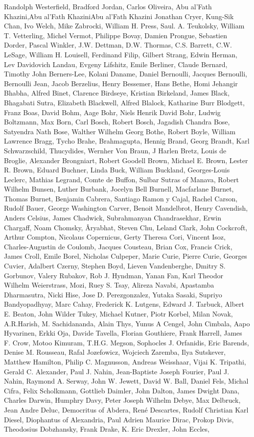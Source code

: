 \begin{spacing}{0.5}
\begin{tiny}
Randolph Westerfield, Bradford Jordan, Carlos Oliveira, Abu al'Fath Khazini,Abu al'Fath KhaziniAbu al'Fath Khazini Jonathan Cryer, Kung-Sik Chan, Ivo Welch, Mike Zabrocki, William H. Press, Saul. A. Teukolsky, William T. Vetterling, Michel Vermot, Philippe Bovay, Damien Prongue, Sebastien Dorder, Pascal Winkler, J.W. Dettman, D.W. Thormas, C.S. Barrett, C.W. LeSage, William H. Louisell, Ferdinand Filip, Gilbert Strang, Edwin Herman, Lev Davidovich Landau, Evgeny Lifshitz, Emile Berliner, Claude Bernard, Timothy John Berners-Lee, Kolani Daname, Daniel Bernoulli, Jacques Bernoulli, Bernoulli Jean, Jacob Berzelius, Henry Bessemer, Hans Bethe, Homi Jehangir Bhabha, Alfred Binet, Clarence Birdseye, Kristian Birkeland, James Black, Bhagabati Sutra, Elizabeth Blackwell, Alfred Blalock, Katharine Burr Blodgett, Franz Boas, David Bohm, Aage Bohr, Niels Henrik David Bohr, Ludwig Boltzmann, Max Born, Carl Bosch, Robert Bosch, Jagadish Chandra Bose, Satyendra Nath Bose, Walther Wilhelm Georg Bothe, Robert Boyle, William Lawrence Bragg, Tycho Brahe, Brahmagupta, Hennig Brand, Georg Brandt, Karl Schwarzschild, Thucydides, Wernher Von Braun, J Harlen Bretz, Louis de Broglie, Alexander Brongniart, Robert Goodell Brown, Michael E. Brown, Lester R. Brown, Eduard Buchner, Linda Buck, William Buckland, Georges-Louis Leclerc, Mathias Legrand, Comte de Buffon, Sulbar Sutras of Manava, Robert Wilhelm Bunsen, Luther Burbank, Jocelyn Bell Burnell, Macfarlane Burnet, Thomas Burnet, Benjamin Cabrera, Santiago Ramon y Cajal, Rachel Carson, Rudolf Bauer, George Washington Carver, Benoit Mandelbrot, Henry Cavendish, Anders Celsius, James Chadwick, Subrahmanyan Chandrasekhar, Erwin Chargaff, Noam Chomsky, Âryabhat, Steven Chu, Leland Clark, John Cockcroft, Arthur Compton, Nicolaus Copernicus, Gerty Theresa Cori, Vincent Isoz, Charles-Augustin de Coulomb, Jacques Cousteau, Brian Cox, Francis Crick, James Croll, Emile Borel, Nicholas Culpeper, Marie Curie, Pierre Curie, Georges Cuvier, Adalbert Czerny, Stephen Boyd, Lieven Vandenberghe, Dmitry S. Gorbunov, Valery Rubakov, Rob J. Hyndman, Yanan Fan, Karl Theodor Wilhelm Weierstrass, Mozi, Ruey S. Tsay, Alireza Navabi, Apastamba Dharmasutra, Nicki Hise, Jose D. Perezgonzalez, Yutaka Sasaki, Supriyo Bandyopadhyay, Marc Cahay, Frederick K. Lutgens, Edward J. Tarbuck, Albert E. Beaton, John Wilder Tukey, Michael Kutner, Piotr Korbel, Milan Novak, A.R.Harish, M. Sachidananda, Alain Thys, Yunus A Cengel, John Cimbala, Aapo Hyvarinen, Erkki Oja, Davide Tavella, Florian Gouthiere, Frank Harrell, James F. Crow, Motoo Kimuram, T.H.G. Megson, Sophocles J. Orfanidis, Eric Barends, Denise M. Rousseau, Rafal Jozefowicz, Wojciech Zaremba, Ilya Sutskever, Matthew Hamilton, Philip C. Magnusson, Andreas Weisshaar, Vijai K. Tripathi, Gerald C. Alexander, Paul J. Nahin, Jean-Baptiste Joseph Fourier, Paul J. Nahin, Raymond A. Serway, John W. Jewett, David W. Ball, Daniel Fels, Michal Cifra, Felix Scholkmann, Gottlieb Daimler, John Dalton, James Dwight Dana, Charles Darwin, Humphry Davy, Peter Joseph Wilhelm Debye, Max Delbruck, Jean Andre Deluc, Democritus of Abdera, René Descartes, Rudolf Christian Karl Diesel, Diophantus of Alexandria, Paul Adrien Maurice Dirac, Prokop Divis, Theodosius Dobzhansky, Frank Drake, K. Eric Drexler, John Eccles, 
\end{tiny}
\end{spacing}
